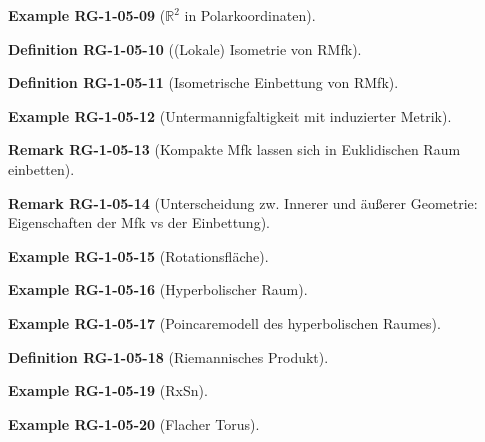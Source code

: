 \documentclass[10pt, letterpaper]{article}
\newcommand{\R}{\mathbb{R}}
\newcommand{\CustomHeading}[3]{%
  \par\medskip\noindent%
  \textbf{#1 #2} \textnormal{(#3)}.\enskip%
}
\newenvironment{DEF}[2]{\CustomHeading{Definition}{#1}{#2}}{}
\newenvironment{REM}[2]{\CustomHeading{Remark}{#1}{#2}}{}
\newenvironment{EXA}[2]{\CustomHeading{Example}{#1}{#2}}{}
\begin{document}
\begin{EXA}{RG-1-05-09}{$\R^2$ in Polarkoordinaten}
\end{EXA}

\begin{DEF}{RG-1-05-10}{(Lokale) Isometrie von RMfk}
\end{DEF}

\begin{DEF}{RG-1-05-11}{Isometrische Einbettung von RMfk}
\end{DEF}

\begin{EXA}{RG-1-05-12}{Untermannigfaltigkeit mit induzierter Metrik}
\end{EXA}

\begin{REM}{RG-1-05-13}{Kompakte Mfk lassen sich in Euklidischen Raum einbetten}
\end{REM}

\begin{REM}{RG-1-05-14}{Unterscheidung zw. Innerer und äußerer Geometrie: Eigenschaften der Mfk vs der Einbettung}
\end{REM}

\begin{EXA}{RG-1-05-15}{Rotationsfläche}
\end{EXA}

\begin{EXA}{RG-1-05-16}{Hyperbolischer Raum}
\end{EXA}

\begin{EXA}{RG-1-05-17}{Poincaremodell des hyperbolischen Raumes}
\end{EXA}

\begin{DEF}{RG-1-05-18}{Riemannisches Produkt}
\end{DEF}

\begin{EXA}{RG-1-05-19}{RxSn}
\end{EXA}

\begin{EXA}{RG-1-05-20}{Flacher Torus}
\end{EXA}
\end{document}
